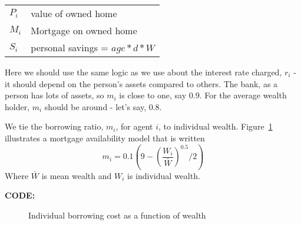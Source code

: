 \begin{tabular}{ll}
$P_i$ & value of owned home\\
$M_i$ & Mortgage on owned home\\
$S_i$ & personal savings = $age*d*W$\\
\end{tabular}

Here we should use the same logic as we use about the interest rate charged, $r_i$ - it should depend on the person's assets compared to others. The bank, as a person has lots of assets, so $m_i$ is close to one, say 0.9. For the average wealth holder, $m_i$ should be around - let's say, 0.8. 

We  tie the borrowing ratio, $m_i$,  for agent $i$, to individual wealth. Figure~\ref{Fig:Borrowingratio} illustrates a mortgage availability  model that is written 
 \[ m_i = 0.1(9-\left(\frac{W_i}{\bar W}\right)^{0.5}/2 )\]
Where $\bar{W}$ is mean wealth and $W_i$ is individual wealth. 




\textbf{CODE:}  

\begin{figure}
\caption{Individual borrowing cost as a function of wealth}
 \label{Fig:Borrowingratio}
\end{figure}



